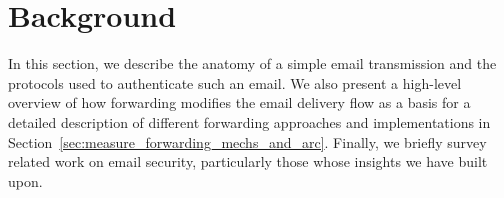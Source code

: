
\section{Background}
\label{sec:background}

In this section, we describe the anatomy of a simple email
transmission and the protocols used to authenticate such an email.
We also present a high-level overview of how forwarding modifies the
email delivery flow as a basis for a detailed description of
different forwarding approaches and implementations in
Section~\ref{sec:measure_forwarding_mechs_and_arc}.  Finally, we
briefly survey related work on email security, particularly
those whose insights we have built upon.

